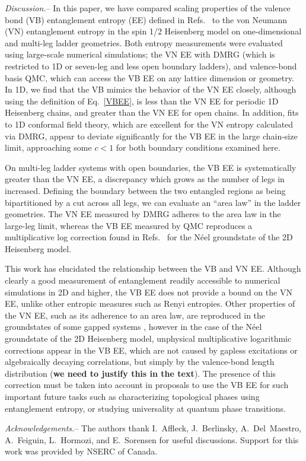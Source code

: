 \documentclass[prl,aps,twocolumn,floatfix,amsmath,amssymb,superscriptaddress,tightenlines]{revtex4}
\begin{document}
{\it Discussion.}-- In this paper, we have compared scaling properties of
the valence bond (VB) entanglement entropy (EE) defined in
Refs.~\cite{Alet,Chh} to the von Neumann (VN) entanglement entropy in the
spin 1/2 Heisenberg model on one-dimensional and multi-leg ladder
geometries.  Both entropy measurements were evaluated using large-scale
numerical simulations; the VN EE with DMRG (which is restricted to 1D or
seven-leg and less open boundary ladders), and valence-bond basis QMC,
which can access the VB EE on any lattice dimension or geometry.  In 1D,
we find that the VB mimics the behavior of the VN EE closely, although
using the definition of Eq.~\eqref{VBEE}, is less than the VN EE for
periodic 1D Heisenberg chains, and greater than the VN EE for open chains.
In addition, fits to 1D conformal field theory, which are excellent for
the VN entropy calculated via DMRG, appear to deviate significantly for
the VB EE in the large chain-size limit, approaching some $c<1$ for both
boundary conditions examined here.

On multi-leg ladder systems with open boundaries, the VB EE is
systematically greater than the VN EE, a discrepancy which grows as the
number of legs in increased.  Defining the boundary between the two
entangled regions as being bipartitioned by a cut across all legs, we can
evaluate an ``area law'' in the ladder geometries.  The VN EE measured by
DMRG adheres to the area law in the large-leg limit, whereas the VB EE
measured by QMC reproduces a multiplicative log correction found in
Refs.~\cite{Alet,Chh} for the N\'eel groundstate of the 2D Heisenberg
model.

This work has elucidated the relationship between the VB and VN EE.
Although clearly a good measurement of entanglement readily accessible to
numerical simulations in 2D and higher, the VB EE does not provide a bound
on the VN EE, unlike other entropic measures such as Renyi entropies.
Other properties of the VN EE, such as its adherence to an area law, are
reproduced in the groundstates of some gapped systems \cite{Alet,Chh},
however in the case of the N\'eel groundstate of the 2D Heisenberg model,
unphysical multiplicative logarithmic corrections appear in the VB EE,
which are not caused by gapless excitations or algebraically decaying
correlations, but simply by the valence-bond length distribution ({\bf we
need to justify this in the text}).  The presence of this correction must
be taken into account in proposals to use the VB EE for such important
future tasks such as characterizing topological phases using entanglement
entropy, or studying universality at quantum phase transitions.

{\it Acknowledgements.}-- The authors thank I.~Affleck, J.~Berlinsky,
A.~Del~Maestro, A.~Feiguin, L.~Hormozi, and E.~Sorensen for useful
discussions. Support for this work was provided by NSERC of Canada.



\end{document}

